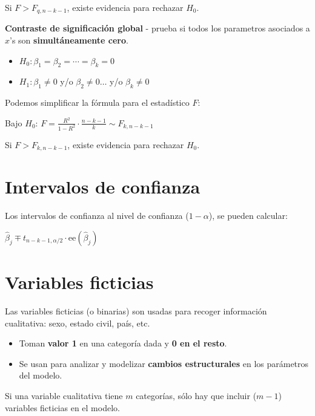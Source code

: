 \documentclass[10pt, a4paper, landscape]{extarticle}
\newcommand{\se}{\mathrm{ee}}
\begin{document}
\begin{multicols}{3}
Si $F > F_{q, n - k - 1}$, existe evidencia para rechazar $H_0$.

\textbf{Contraste de significación global} - prueba si todos los parametros asociados a $x$'s son \textbf{simultáneamente cero}.

\begin{itemize}[leftmargin=*]
	\item $H_0: \beta_1 = \beta_2 = \cdots = \beta_k = 0$
	\item $H_1: \beta_1 \neq 0$ y/o $\beta_2 \neq 0 \ldots$ y/o $\beta_k \neq 0$
\end{itemize}

Podemos simplificar la fórmula para el estadístico $F$:

\begin{center}
	Bajo $H_0$: \quad $F = \frac{R^2}{1 - R^2} \cdot \frac{n - k - 1}{k} \sim F_{k, n - k - 1}$
\end{center}

Si $F > F_{k, n - k - 1}$, existe evidencia para rechazar $H_0$.

\section*{Intervalos de confianza}

Los intervalos de confianza al nivel de confianza ($1 - \alpha$), se pueden calcular:

\begin{center}
	$\hat{\beta}_j \mp t_{n - k - 1, \alpha/2} \cdot \se(\hat{\beta}_j)$
\end{center}

\section*{Variables ficticias}

Las variables ficticias (o binarias) son usadas para recoger información cualitativa: sexo, estado civil, país, etc.

\begin{itemize}[leftmargin=*]
	\item Toman \textbf{valor 1} en una categoría dada y \textbf{0 en el resto}.
	\item Se usan para analizar y modelizar \textbf{cambios estructurales} en los parámetros del modelo.
\end{itemize}

Si una variable cualitativa tiene $m$ categorías, sólo hay que incluir ($m - 1$) variables ficticias en el modelo.


\end{multicols}
\end{document}
